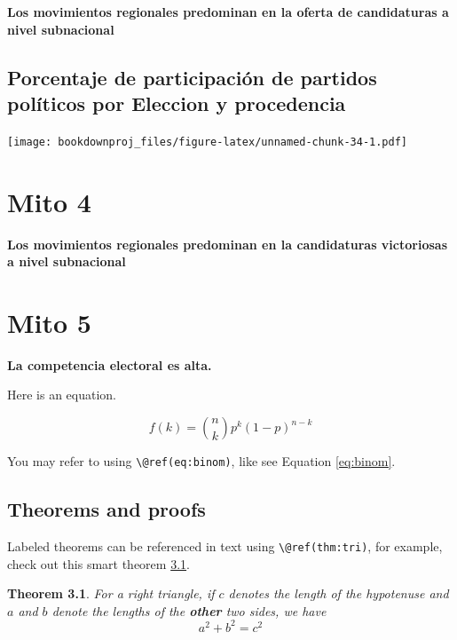 \documentclass[
]{book}
\newtheorem{theorem}{Theorem}[chapter]
\theoremstyle{definition}
\theoremstyle{definition}
\theoremstyle{definition}
\theoremstyle{definition}
\theoremstyle{remark}
\begin{document}
\textbf{Los movimientos regionales predominan en la oferta de candidaturas a nivel subnacional}

\hypertarget{porcentaje-de-participaciuxf3n-de-partidos-poluxedticos-por-eleccion-y-procedencia}{%
\section{Porcentaje de participación de partidos políticos por Eleccion y procedencia}\label{porcentaje-de-participaciuxf3n-de-partidos-poluxedticos-por-eleccion-y-procedencia}}

\texttt{[image: bookdownproj\_files/figure-latex/unnamed-chunk-34-1.pdf]}

\hypertarget{mito-4}{%
\chapter{Mito 4}\label{mito-4}}

\textbf{Los movimientos regionales predominan en la candidaturas victoriosas a nivel subnacional}

\hypertarget{mito-5}{%
\chapter{Mito 5}\label{mito-5}}

\textbf{La competencia electoral es alta.}

Here is an equation.

\begin{equation} 
  f\left(k\right) = \binom{n}{k} p^k\left(1-p\right)^{n-k}
  \label{eq:binom}
\end{equation}

You may refer to using \texttt{\textbackslash{}@ref(eq:binom)}, like see Equation \eqref{eq:binom}.

\hypertarget{theorems-and-proofs}{%
\section{Theorems and proofs}\label{theorems-and-proofs}}

Labeled theorems can be referenced in text using \texttt{\textbackslash{}@ref(thm:tri)}, for example, check out this smart theorem \ref{thm:tri}.

\begin{theorem}
\protect\hypertarget{thm:tri}{}\label{thm:tri}For a right triangle, if \(c\) denotes the \emph{length} of the hypotenuse
and \(a\) and \(b\) denote the lengths of the \textbf{other} two sides, we have
\[a^2 + b^2 = c^2\]
\end{theorem}
\end{document}
